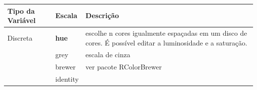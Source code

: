\documentclass[]{book}
\begin{document}
\begin{longtable}[]{@{}lll@{}}
\toprule
\begin{minipage}[b]{0.12\columnwidth}\raggedright\strut
Tipo da Variável\strut
\end{minipage} & \begin{minipage}[b]{0.11\columnwidth}\raggedright\strut
Escala\strut
\end{minipage} & \begin{minipage}[b]{0.68\columnwidth}\raggedright\strut
Descrição\strut
\end{minipage}\tabularnewline
\midrule
\endhead
\begin{minipage}[t]{0.12\columnwidth}\raggedright\strut
Discreta\strut
\end{minipage} & \begin{minipage}[t]{0.11\columnwidth}\raggedright\strut
\textbf{hue}\strut
\end{minipage} & \begin{minipage}[t]{0.68\columnwidth}\raggedright\strut
escolhe n cores igualmente espaçadas em um disco de cores. É possível
editar a luminosidade e a saturação.\strut
\end{minipage}\tabularnewline
\begin{minipage}[t]{0.12\columnwidth}\raggedright\strut
\strut
\end{minipage} & \begin{minipage}[t]{0.11\columnwidth}\raggedright\strut
grey\strut
\end{minipage} & \begin{minipage}[t]{0.68\columnwidth}\raggedright\strut
escala de cinza\strut
\end{minipage}\tabularnewline
\begin{minipage}[t]{0.12\columnwidth}\raggedright\strut
\strut
\end{minipage} & \begin{minipage}[t]{0.11\columnwidth}\raggedright\strut
brewer\strut
\end{minipage} & \begin{minipage}[t]{0.68\columnwidth}\raggedright\strut
ver pacote RColorBrewer\strut
\end{minipage}\tabularnewline
\begin{minipage}[t]{0.12\columnwidth}\raggedright\strut
\strut
\end{minipage} & \begin{minipage}[t]{0.11\columnwidth}\raggedright\strut
identity\strut
\end{minipage} & \begin{minipage}[t]{0.68\columnwidth}\raggedright\strut

\end{minipage}
\end{longtable}
\end{document}
